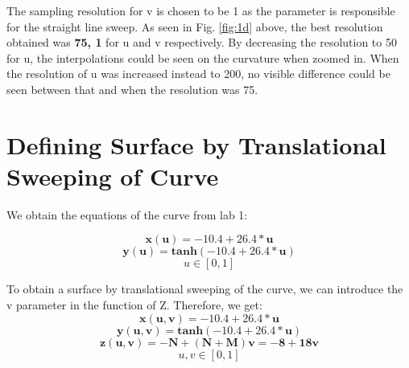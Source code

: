 \documentclass[acmlarge,nonacm=true]{acmart}
\begin{document}
The sampling resolution for v is chosen to be 1 as the parameter is responsible for the straight line sweep.
 As seen in Fig. \ref{fig:1d} above, the best resolution obtained was \textbf{75, 1} for u and v respectively.
By decreasing the resolution to 50 for u, the interpolations could be seen on the curvature when zoomed in. When the resolution of u was 
increased instead to 200, no visible difference could be seen between that and when the resolution was 75.

\section{Defining Surface by Translational Sweeping of Curve}
We obtain the equations of the curve from lab 1:

\begin{displaymath}
	\mathbf{x(u) = -10.4 + 26.4*u}
\end{displaymath}
\begin{displaymath}
	\mathbf{y(u) = tanh(-10.4 + 26.4*u)}
\end{displaymath}
\begin{displaymath}
	u \in [0,1]
\end{displaymath}

To obtain a surface by translational sweeping of the curve, we can introduce the v parameter in the function of Z.
Therefore, we get:\\
\begin{displaymath}
	\mathbf{x(u,v) = -10.4 + 26.4*u}
\end{displaymath}
\begin{displaymath}
	\mathbf{y(u,v) = tanh(-10.4 + 26.4*u)}
\end{displaymath}
\begin{displaymath}
	\mathbf{z(u,v) = -N + (N+M)v = -8 + 18v}
\end{displaymath}
\begin{displaymath}
	u,v \in [0,1]
\end{displaymath}
\end{document}
